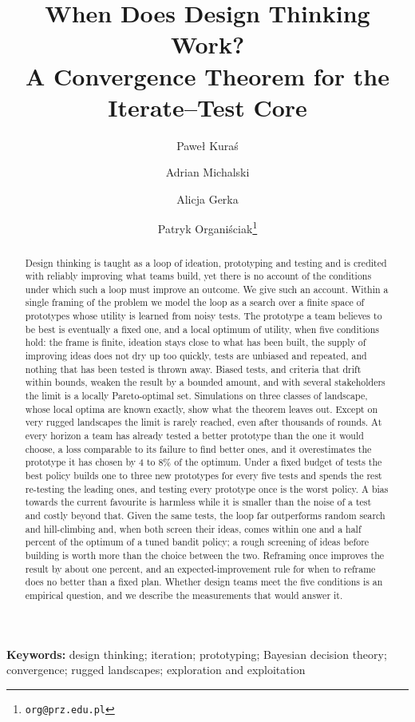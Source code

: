 \documentclass[10pt,twocolumn]{article}
\title{\textbf{When Does Design Thinking Work?\\A Convergence Theorem for the Iterate--Test Core}}
\author[1]{Paweł Kuraś}
\author[2]{Adrian Michalski}
\author[3]{Alicja Gerka}
\author[3]{Patryk Organiściak\thanks{\texttt{org@prz.edu.pl}}}
\affil[1]{Institute of Telecommunications, AGH University of Science and Technology, Kraków, Poland}
\affil[2]{Faculty of Mathematics and Applied Sciences, Rzeszów University of Technology, Rzeszów, Poland}
\affil[3]{Department of Complex Systems, Rzeszów University of Technology, Rzeszów, Poland}
\date{}
\theoremstyle{definition}
\begin{document}
\maketitle


\begin{abstract}
\noindent Design thinking is taught as a loop of ideation, prototyping and testing and is credited with reliably improving what teams build, yet there is no account of the conditions under which such a loop must improve an outcome. We give such an account. Within a single framing of the problem we model the loop as a search over a finite space of prototypes whose utility is learned from noisy tests. The prototype a team believes to be best is eventually a fixed one, and a local optimum of utility, when five conditions hold: the frame is finite, ideation stays close to what has been built, the supply of improving ideas does not dry up too quickly, tests are unbiased and repeated, and nothing that has been tested is thrown away. Biased tests, and criteria that drift within bounds, weaken the result by a bounded amount, and with several stakeholders the limit is a locally Pareto-optimal set. Simulations on three classes of landscape, whose local optima are known exactly, show what the theorem leaves out. Except on very rugged landscapes the limit is rarely reached, even after thousands of rounds. At every horizon a team has already tested a better prototype than the one it would choose, a loss comparable to its failure to find better ones, and it overestimates the prototype it has chosen by 4 to 8\% of the optimum. Under a fixed budget of tests the best policy builds one to three new prototypes for every five tests and spends the rest re-testing the leading ones, and testing every prototype once is the worst policy. A bias towards the current favourite is harmless while it is smaller than the noise of a test and costly beyond that. Given the same tests, the loop far outperforms random search and hill-climbing and, when both screen their ideas, comes within one and a half percent of the optimum of a tuned bandit policy; a rough screening of ideas before building is worth more than the choice between the two. Reframing once improves the result by about one percent, and an expected-improvement rule for when to reframe does no better than a fixed plan. Whether design teams meet the five conditions is an empirical question, and we describe the measurements that would answer it.
\end{abstract}

\vspace{0.4em}
\noindent\textbf{Keywords:} design thinking; iteration; prototyping; Bayesian decision theory; convergence; rugged landscapes; exploration and exploitation
\end{document}
